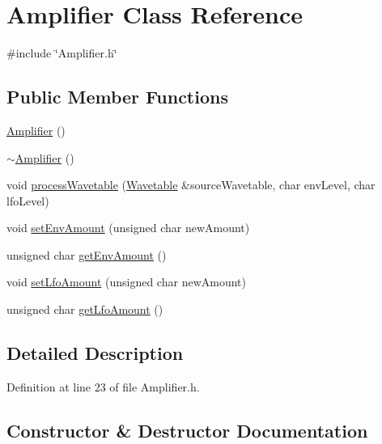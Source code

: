 \hypertarget{class_amplifier}{}\section{Amplifier Class Reference}
\label{class_amplifier}


{\ttfamily \#include \char`\"{}Amplifier.\+h\char`\"{}}

\subsection*{Public Member Functions}
\begin{DoxyCompactItemize}
\item 
\hyperlink{class_amplifier_ad89ce9e2bd6877057d15266d0d3feb4e}{Amplifier} ()
\item 
\hyperlink{class_amplifier_a6cb2421d049843d6b1994364ea29aabd}{$\sim$\+Amplifier} ()
\item 
void \hyperlink{class_amplifier_a3f1ec0c50fdb0adb71e2f7576e38170a}{process\+Wavetable} (\hyperlink{class_wavetable}{Wavetable} \&source\+Wavetable, char env\+Level, char lfo\+Level)
\item 
void \hyperlink{class_amplifier_a1106605e158c9855d4e303e6972baf9f}{set\+Env\+Amount} (unsigned char new\+Amount)
\item 
unsigned char \hyperlink{class_amplifier_a4cb59ec35a428bf0361799326fbb42c3}{get\+Env\+Amount} ()
\item 
void \hyperlink{class_amplifier_a99593afade53ffadc6958861e38b612a}{set\+Lfo\+Amount} (unsigned char new\+Amount)
\item 
unsigned char \hyperlink{class_amplifier_aeb4c113b992aae7b6fa96fb7ebf9a5ca}{get\+Lfo\+Amount} ()
\end{DoxyCompactItemize}


\subsection{Detailed Description}


Definition at line 23 of file Amplifier.\+h.



\subsection{Constructor \& Destructor Documentation}
\mbox{\label{class_amplifier_ad89ce9e2bd6877057d15266d0d3feb4e}} 
